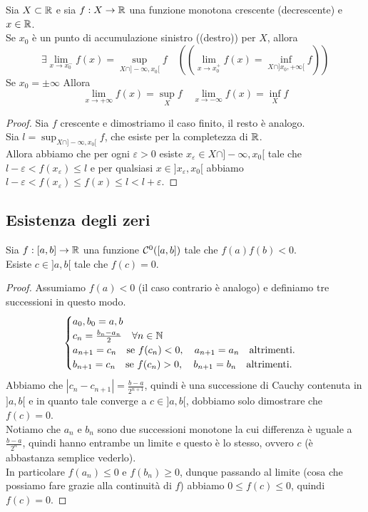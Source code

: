 \documentclass{article}
\begin{document}
\begin{theorem}{}{}
    Sia $X\subset\mathbb{R}$ e sia $f:X\to \mathbb{R}$ una funzione monotona crescente (decrescente) e $x \in \mathbb{R}$.\\
    Se $x_0$ è un punto di accumulazione sinistro ((destro)) per $X$, allora \[\exists \lim_{x\to x_0^-} f(x) = \sup_{X\cap ]-\infty, x_0[} f \quad \left(\left(\lim_{x\to x_0^+} f(x) = \inf_{X\cap ]x_0,+\infty[} f\right)\right)\]
    Se $x_0=\pm\infty$ Allora
    \[\lim_{x\to+\infty} f(x) = \sup_X f \quad \lim_{x\to-\infty} f(x) = \inf_X f\]
\end{theorem}
\begin{proof}
    Sia $f$ crescente e dimostriamo il caso finito, il resto è analogo.\\
    Sia $l = \sup_{X\cap]-\infty, x_0[ }f$, che esiste per la completezza di $\mathbb{R}$.\\
    Allora abbiamo che per ogni $\varepsilon >0$ esiste $x_\varepsilon \in X\cap]-\infty, x_0[$ tale che $l-\varepsilon < f(x_\varepsilon)\le l$ e per qualsiasi $x \in ]x_\varepsilon, x_0[$ abbiamo $l-\varepsilon < f(x_\varepsilon) \le f(x) \le l < l+\varepsilon$.
\end{proof}

\subsection{Esistenza degli zeri}

\begin{theorem}{}{}
    Sia $f: [a,b]\to \mathbb{R}$ una funzione $\mathcal{C}^0([a,b])$ tale che $f(a)f(b)< 0$.\\
    Esiste $c \in ]a,b[$ tale che $f(c)=0$.
\end{theorem}
\begin{proof}
    Assumiamo $f(a)<0$ (il caso contrario è analogo) e definiamo tre successioni in questo modo.
    \[\begin{cases}
        a_0, b_0 = a,b\\
        c_n = \frac{b_n - a_n}{2} \quad \forall n\in\mathbb{N}\\
        a_{n+1} = c_n \quad \text{se } f(c_n) < 0, \quad a_{n+1}=a_n \quad \text{altrimenti}.\\
        b_{n+1} = c_n \quad \text{se } f(c_n) > 0, \quad b_{n+1}=b_n \quad \text{altrimenti}.
    \end{cases}\]
    Abbiamo che $|c_n - c_{n+1}| = \frac{b-a}{2^{n+1}}$, quindi è una successione di Cauchy contenuta in $]a,b[$ e in quanto tale converge a $c\in ]a,b[$, dobbiamo solo dimostrare che $f(c)=0$.\\
    Notiamo che $a_n$ e $b_n$ sono due successioni monotone la cui differenza è uguale a $\frac{b-a}{2^n}$, quindi hanno entrambe un limite e questo è lo stesso, ovvero $c$ (è abbastanza semplice vederlo).\\
    In particolare $f(a_n) \le 0$ e $f(b_n)\ge 0$, dunque passando al limite (cosa che possiamo fare grazie alla continuità di $f$) abbiamo $0 \le f(c) \le 0$, quindi $f(c)=0$.
\end{proof}
\end{document}
